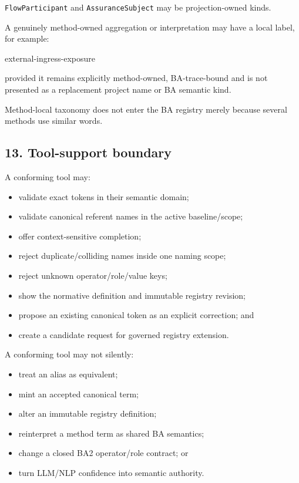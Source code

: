 \documentclass[
  10pt,
  a4paper,
]{article}
\newenvironment{Shaded}{}{}
\newcommand{\NormalTok}[1]{#1}
\providecommand{\tightlist}{%
  \setlength{\itemsep}{0pt}\setlength{\parskip}{0pt}}
\begin{document}
\texttt{FlowParticipant} and \texttt{AssuranceSubject} may be
projection-owned kinds.

A genuinely method-owned aggregation or interpretation may have a local
label, for example:

\begin{Shaded}
\begin{Highlighting}[]
\NormalTok{external{-}ingress{-}exposure}
\end{Highlighting}
\end{Shaded}

provided it remains explicitly method-owned, BA-trace-bound and is not
presented as a replacement project name or BA semantic kind.

Method-local taxonomy does not enter the BA registry merely because
several methods use similar words.

\subsection{13. Tool-support boundary}\label{13-tool-support-boundary}

A conforming tool may:

\begin{itemize}
\tightlist
\item
  validate exact tokens in their semantic domain;
\item
  validate canonical referent names in the active baseline/scope;
\item
  offer context-sensitive completion;
\item
  reject duplicate/colliding names inside one naming scope;
\item
  reject unknown operator/role/value keys;
\item
  show the normative definition and immutable registry revision;
\item
  propose an existing canonical token as an explicit correction; and
\item
  create a candidate request for governed registry extension.
\end{itemize}

A conforming tool may not silently:

\begin{itemize}
\tightlist
\item
  treat an alias as equivalent;
\item
  mint an accepted canonical term;
\item
  alter an immutable registry definition;
\item
  reinterpret a method term as shared BA semantics;
\item
  change a closed BA2 operator/role contract; or
\item
  turn LLM/NLP confidence into semantic authority.
\end{itemize}
\end{document}
